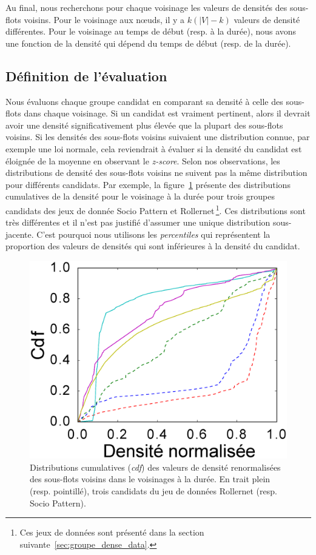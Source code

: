 Au final, nous recherchons pour chaque voisinage les valeurs de densités des sous-flots voisins.
Pour le voisinage aux n\oe{}uds, il y a $k(|V|-k)$ valeurs de densité différentes.
Pour le voisinage au temps de début (resp. à la durée), nous avons une fonction de la densité qui dépend du temps de début (resp. de la durée).


\subsection{Définition de l'évaluation}
Nous évaluons chaque groupe candidat en comparant sa densité à celle des sous-flots dans chaque voisinage.
Si un candidat est vraiment pertinent, alors il devrait avoir une densité significativement plus élevée que la plupart des sous-flots voisins.
Si les densités des sous-flots voisins suivaient une distribution connue, par exemple une loi normale, cela reviendrait à évaluer si la densité du candidat est éloignée de la moyenne en observant le \emph{z-score}.
Selon nos observations, les distributions de densité des sous-flots voisins ne suivent pas la même distribution pour différents candidats.
Par exemple, la figure~\ref{fig:distrib_dens} présente des distributions cumulatives de la densité pour le voisinage à la durée pour trois groupes candidats des jeux de donnée Socio Pattern et Rollernet\,\footnote{Ces jeux de données sont présenté dans la section suivante~\ref{sec:groupe_dense_data}.}.
Ces distributions sont très différentes et il n'est pas justifié d'assumer une unique distribution sous-jacente.
C'est pourquoi nous utilisons les \emph{percentiles} qui représentent la proportion des valeurs de densités qui sont inférieures à la densité du candidat.


\begin{figure}[h]
\centering
\includegraphics[width=0.3\linewidth]{img/GroupeDense/cdf_density_duration.eps}
\caption{Distributions cumulatives (\emph{cdf}) des valeurs de densité renormalisées des sous-flots voisins dans le voisinages à la durée.
En trait plein (resp. pointillé), trois candidats du jeu de données Rollernet (resp. Socio Pattern).}
\label{fig:distrib_dens}
\end{figure}

